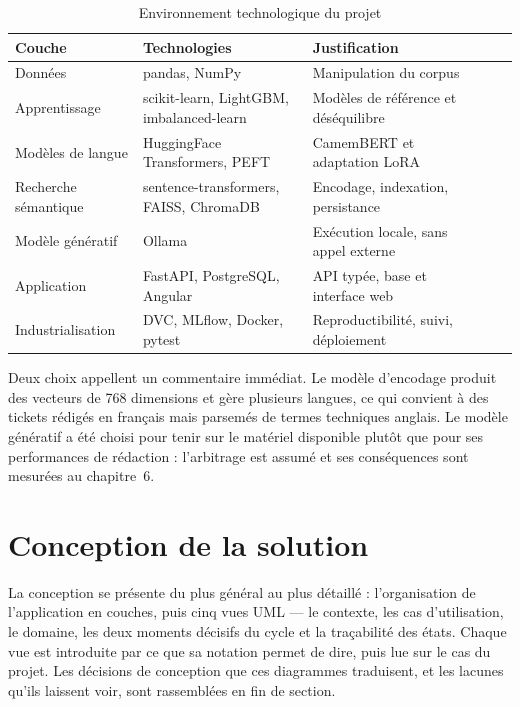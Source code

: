 \begin{table}[!htbp]
\centering
\styletableau
\caption{Environnement technologique du projet}
\label{tab:stack}
\begin{tabular}{|Bp{3.2cm}|Lp{5.1cm}|Lp{5.1cm}|}
\hline
{}
\textbf{Couche} & \textbf{Technologies} & \textbf{Justification} \\
\hline
Données & pandas, NumPy & Manipulation du corpus \\
\hline
Apprentissage & scikit-learn, LightGBM, imbalanced-learn & Modèles de référence et déséquilibre \\
\hline
Modèles de langue & HuggingFace Transformers, PEFT & CamemBERT et adaptation LoRA \\
\hline
Recherche sémantique & sentence-transformers, FAISS, ChromaDB & Encodage, indexation, persistance \\
\hline
Modèle génératif & Ollama & Exécution locale, sans appel externe \\
\hline
Application & FastAPI, PostgreSQL, Angular & API typée, base et interface web \\
\hline
Industrialisation & DVC, MLflow, Docker, pytest & Reproductibilité, suivi, déploiement \\
\hline
\end{tabular}
\end{table}

Deux choix appellent un commentaire immédiat. Le modèle d'encodage produit des vecteurs de
768 dimensions et gère plusieurs langues, ce qui convient à des tickets rédigés en français mais
parsemés de termes techniques anglais. Le modèle génératif a été choisi pour tenir sur le matériel
disponible plutôt que pour ses performances de rédaction : l'arbitrage est assumé et ses conséquences sont mesurées au chapitre~6.

\section{Conception de la solution}

\label{sec:conception7}

La conception se présente du plus général au plus détaillé : l'organisation de l'application en
couches, puis cinq vues UML — le contexte, les cas d'utilisation, le domaine, les deux moments
décisifs du cycle et la traçabilité des états. Chaque vue est introduite par ce que sa notation
permet de dire, puis lue sur le cas du projet. Les décisions de conception que ces diagrammes
traduisent, et les lacunes qu'ils laissent voir, sont rassemblées en fin de section.

